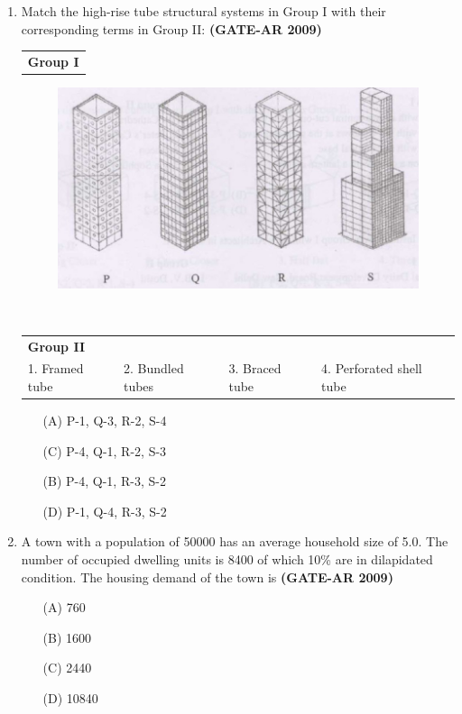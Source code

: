 \documentclass[a4paper,10pt]{article}
\begin{document}
\begin{enumerate}
    \item Match the high-rise tube structural systems in Group I with their corresponding terms in Group II: \hfill \textbf{(GATE-AR 2009)} \\
    \begin{tabular}{ p{\dimexpr\columnwidth-2\tabcolsep} }
	\textbf{Group I} \\
	\end{tabular}
	\begin{figure}[h!]
        \centering
        \includegraphics[width=0.5\linewidth]{figs/img_02.jpg}
        \label{fig:Img02}
	\end{figure} \\
	\begin{tabular}{ p{\dimexpr\columnwidth-2\tabcolsep} p{\dimexpr\columnwidth-2\tabcolsep} p{\dimexpr\columnwidth-2\tabcolsep} p{\dimexpr\columnwidth-2\tabcolsep} }
	\textbf{Group II} & & & \\
	1. Framed tube & 2. Bundled tubes & 3. Braced tube & 4. Perforated shell tube \\
	\end{tabular}
	\begin{multicols}{2}
	\begin{itemize}
        \item[(A)] P-1, Q-3, R-2, S-4
        \item[(C)] P-4, Q-1, R-2, S-3
        \item[(B)] P-4, Q-1, R-3, S-2
        \item[(D)] P-1, Q-4, R-3, S-2
    \end{itemize}
	\end{multicols}

    \item A town with a population of 50000 has an average household size of 5.0. The number of occupied dwelling units is 8400 of which 10\% are in dilapidated condition. The housing demand of the town is \hfill \textbf{(GATE-AR 2009)}
    \begin{multicols}{4}
	\begin{itemize}
        \item[(A)] 760
        \item[(B)] 1600
        \item[(C)] 2440
        \item[(D)] 10840
    \end{itemize}
	\end{multicols}


\end{enumerate}
\end{document}
